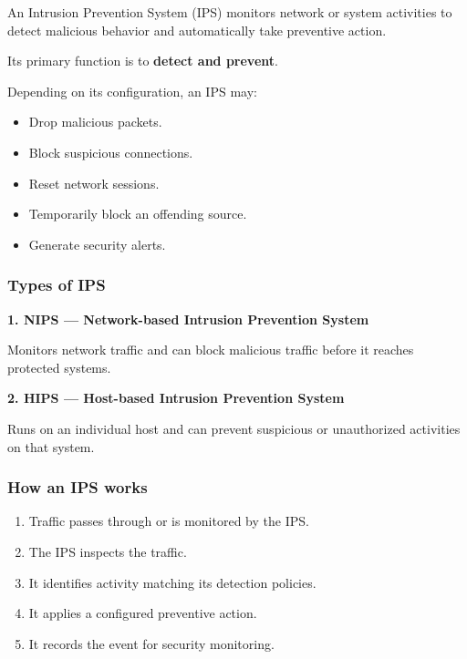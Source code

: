 An Intrusion Prevention System (IPS) monitors network or system activities to detect malicious behavior and automatically take preventive action.

Its primary function is to \textbf{detect and prevent}.

Depending on its configuration, an IPS may:

\begin{itemize}
\item Drop malicious packets.
\item Block suspicious connections.
\item Reset network sessions.
\item Temporarily block an offending source.
\item Generate security alerts.
\end{itemize}

\subsubsection{Types of IPS}

\textbf{1. NIPS --- Network-based Intrusion Prevention System}

Monitors network traffic and can block malicious traffic before it reaches protected systems.

\textbf{2. HIPS --- Host-based Intrusion Prevention System}

Runs on an individual host and can prevent suspicious or unauthorized activities on that system.

\subsubsection{How an IPS works}

\begin{enumerate}
\item Traffic passes through or is monitored by the IPS.
\item The IPS inspects the traffic.
\item It identifies activity matching its detection policies.
\item It applies a configured preventive action.
\item It records the event for security monitoring.
\end{enumerate}

